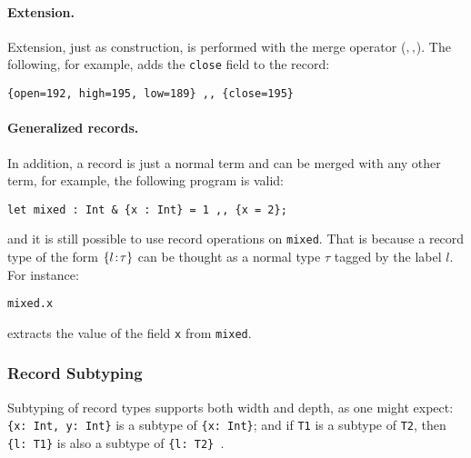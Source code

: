 \paragraph{Extension.}
Extension, just as construction, is performed with the merge operator
($ ,, $). The following, for example, adds the \lstinline{close}
field to the record:
\begin{lstlisting}
{open=192, high=195, low=189} ,, {close=195}
\end{lstlisting}

\paragraph{Generalized records.}
In addition, a record is just a normal term and can be merged with any other
term, for example, the following program is valid:
\begin{lstlisting}
let mixed : Int & {x : Int} = 1 ,, {x = 2};
\end{lstlisting}
and it is still possible to use record operations on
\lstinline{mixed}. That is because a record type of the form $ \{ l \!:\! \tau \} $ can be thought as a normal type $ \tau $ tagged by the label
$ l $. For instance:
\begin{lstlisting}
mixed.x
\end{lstlisting}

\noindent extracts the value of the field \lstinline{x} from \lstinline{mixed}.

\subsubsection{Record Subtyping}

Subtyping of record types supports both width and depth, as one might
expect: \lstinline${x: Int, y: Int}$ is a subtype of
\lstinline${x: Int}$; and if \lstinline$T1$ is a subtype of
\lstinline$T2$, then \lstinline${l: T1}$ is also a subtype of
\lstinline${l: T2} $.



